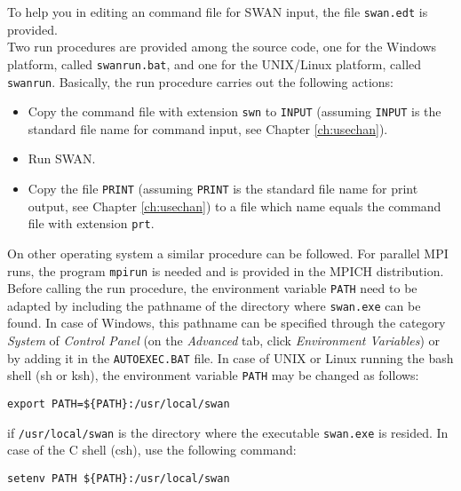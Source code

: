 \documentclass[12pt]{book}
\begin{document}
To help you in editing an command file for SWAN input, the file {\tt swan.edt} is provided.
\\[2ex]
\noindent
Two run procedures are provided among the source code, one for the Windows platform, called
{\tt swanrun.bat}, and one for the UNIX/Linux platform, called {\tt swanrun}. Basically, the
run procedure carries out the following actions:
\begin{itemize}
  \item Copy the command file with extension {\tt swn} to {\tt INPUT} (assuming {\tt INPUT} is
        the standard file name for command input, see Chapter \ref{ch:usechan}).
  \item Run SWAN.
  \item Copy the file {\tt PRINT} (assuming {\tt PRINT} is the standard file name for print
        output, see Chapter \ref{ch:usechan}) to a file which name equals the command file
        with extension {\tt prt}.
\end{itemize}
On other operating system a similar procedure can be followed. For parallel MPI runs, the
program {\tt mpirun} is needed and is provided in the MPICH distribution.
\\[2ex]
\noindent
Before calling the run procedure, the environment variable {\small \tt PATH} need to be adapted by
including the pathname of the directory where {\tt swan.exe} can be found. In case of Windows,
this pathname can be specified through the category {\it System} of {\it Control Panel} (on the
{\it Advanced} tab, click {\it Environment Variables}) or by adding it in the {\tt AUTOEXEC.BAT}
file. In case of UNIX or Linux running the bash shell (sh or ksh), the environment variable
{\small \tt PATH} may be changed as follows:
\begin{verbatim}
export PATH=${PATH}:/usr/local/swan
\end{verbatim}
if {\tt /usr/local/swan} is the directory where the executable {\tt swan.exe} is resided.
In case of the C shell (csh), use the following command:
\begin{verbatim}
setenv PATH ${PATH}:/usr/local/swan
\end{verbatim}
\end{document}

